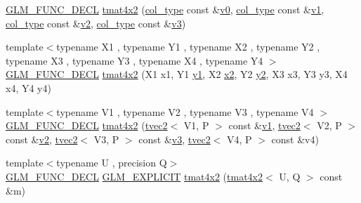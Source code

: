 \begin{DoxyCompactItemize}
\mbox{\hyperlink{setup_8hpp_ab2d052de21a70539923e9bcbf6e83a51}{G\+L\+M\+\_\+\+F\+U\+N\+C\+\_\+\+D\+E\+CL}} \mbox{\hyperlink{structglm_1_1tmat4x2_aa89564f4323d095565f9072ef4b01c75}{tmat4x2}} (\mbox{\hyperlink{structglm_1_1tmat4x2_ac775231a890f4ea29cd0073670309b3a}{col\+\_\+type}} const \&\mbox{\hyperlink{glad_8h_a7062a23d1d434121d4a88f530703d06a}{v0}}, \mbox{\hyperlink{structglm_1_1tmat4x2_ac775231a890f4ea29cd0073670309b3a}{col\+\_\+type}} const \&\mbox{\hyperlink{glad_8h_a0779c3b73f9aa3a0ac5b0139b5d291d9}{v1}}, \mbox{\hyperlink{structglm_1_1tmat4x2_ac775231a890f4ea29cd0073670309b3a}{col\+\_\+type}} const \&\mbox{\hyperlink{glad_8h_a9a09a1837922b2b806f4589096a52049}{v2}}, \mbox{\hyperlink{structglm_1_1tmat4x2_ac775231a890f4ea29cd0073670309b3a}{col\+\_\+type}} const \&\mbox{\hyperlink{glad_8h_acc806b31cbf466ceba6555983d8b814d}{v3}})
\item 
{\footnotesize template$<$typename X1 , typename Y1 , typename X2 , typename Y2 , typename X3 , typename Y3 , typename X4 , typename Y4 $>$ }\\\mbox{\hyperlink{setup_8hpp_ab2d052de21a70539923e9bcbf6e83a51}{G\+L\+M\+\_\+\+F\+U\+N\+C\+\_\+\+D\+E\+CL}} \mbox{\hyperlink{structglm_1_1tmat4x2_a1f10ec226d91b1b7d78aaf5c6c10b34b}{tmat4x2}} (X1 x1, Y1 \mbox{\hyperlink{glad_8h_a48340161068d267815ac3131e9d03def}{y1}}, X2 \mbox{\hyperlink{glad_8h_ad2cea6eadb01f017f0d57e7edf0ce988}{x2}}, Y2 \mbox{\hyperlink{glad_8h_af7158b5d27f7a6aa4ab9973fcc3a5c20}{y2}}, X3 x3, Y3 y3, X4 x4, Y4 y4)
\item 
{\footnotesize template$<$typename V1 , typename V2 , typename V3 , typename V4 $>$ }\\\mbox{\hyperlink{setup_8hpp_ab2d052de21a70539923e9bcbf6e83a51}{G\+L\+M\+\_\+\+F\+U\+N\+C\+\_\+\+D\+E\+CL}} \mbox{\hyperlink{structglm_1_1tmat4x2_a7cd1e8f9db551f8fd8e813c19896349f}{tmat4x2}} (\mbox{\hyperlink{structglm_1_1tvec2}{tvec2}}$<$ V1, P $>$ const \&\mbox{\hyperlink{glad_8h_a0779c3b73f9aa3a0ac5b0139b5d291d9}{v1}}, \mbox{\hyperlink{structglm_1_1tvec2}{tvec2}}$<$ V2, P $>$ const \&\mbox{\hyperlink{glad_8h_a9a09a1837922b2b806f4589096a52049}{v2}}, \mbox{\hyperlink{structglm_1_1tvec2}{tvec2}}$<$ V3, P $>$ const \&\mbox{\hyperlink{glad_8h_acc806b31cbf466ceba6555983d8b814d}{v3}}, \mbox{\hyperlink{structglm_1_1tvec2}{tvec2}}$<$ V4, P $>$ const \&v4)
\item 
{\footnotesize template$<$typename U , precision Q$>$ }\\\mbox{\hyperlink{setup_8hpp_ab2d052de21a70539923e9bcbf6e83a51}{G\+L\+M\+\_\+\+F\+U\+N\+C\+\_\+\+D\+E\+CL}} \mbox{\hyperlink{setup_8hpp_a6c74f5a5e7b134ab69023ff9a30d4d5d}{G\+L\+M\+\_\+\+E\+X\+P\+L\+I\+C\+IT}} \mbox{\hyperlink{structglm_1_1tmat4x2_a23ca50837bdbc3d1d47bd7010bdb7fa3}{tmat4x2}} (\mbox{\hyperlink{structglm_1_1tmat4x2}{tmat4x2}}$<$ U, Q $>$ const \&m)

\end{DoxyCompactItemize}
